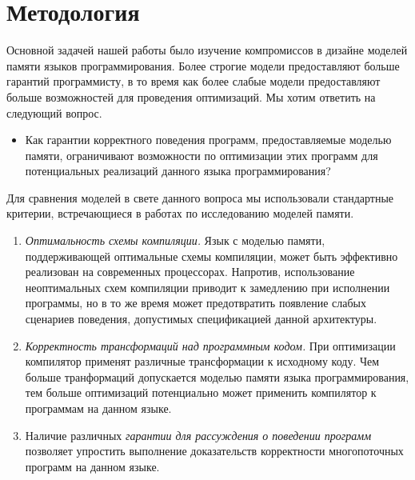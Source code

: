 \section{Методология}
\label{sec:methodology}

Основной задачей нашей работы было изучение
компромиссов в дизайне моделей памяти 
языков программирования. 
Более строгие модели предоставляют больше гарантий программисту,
в то время как более слабые модели предоставляют 
больше возможностей для проведения оптимизаций. 
Мы хотим ответить на следующий вопрос. 

\begin{itemize}
  \item Как гарантии корректного поведения программ, 
    предоставляемые моделью памяти, ограничивают возможности 
    по оптимизации этих программ для потенциальных реализаций
    данного языка программирования?
\end{itemize}

Для сравнения моделей в свете данного вопроса мы использовали стандартные критерии,
встречающиеся в работах по исследованию моделей памяти. 

\begin{enumerate}[label=\textbf{C.\arabic*}]
  
  \item \label{item:criteria:opt-comp}
    \emph{Оптимальность схемы компиляции.}
    Язык с моделью памяти, поддерживающей оптимальные 
    схемы компиляции, может быть эффективно реализован
    на современных процессорах. 
    Напротив, использование неоптимальных схем компиляции
    приводит к замедлению при исполнении программы, 
    но в то же время может предотвратить появление 
    слабых сценариев поведения, допустимых спецификацией данной архитектуры. 

  \item \label{item:criteria:sound-trans}
    \emph{Корректность трансформаций над программным кодом.} 
    При оптимизации компилятор
    применят различные трансформации к исходному коду. 
    Чем больше транформаций допускается моделью памяти языка программирования, 
    тем больше оптимизаций потенциально может применить компилятор 
    к программам на данном языке. 

  \item \label{item:criteria:reasoning}
    Наличие  различных \emph{гарантии для рассуждения о поведении программ}
    позволяет упростить  выполнение доказательств  корректности 
    многопоточных программ  на данном языке. 
  
\end{enumerate}

